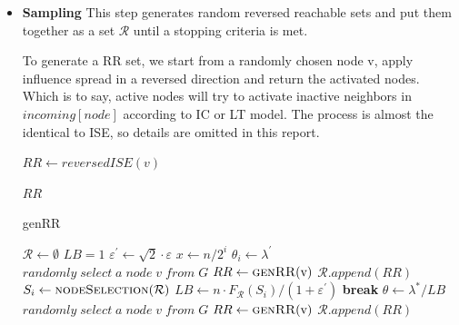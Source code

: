 \documentclass[conference]{IEEEtran}
\begin{document}
    \begin{itemize}
        \item \textbf{Sampling}
        This step generates random reversed reachable sets and put them together as a set $\mathcal{R}$ until a stopping criteria is met.

        
        
        To generate a RR set, we start from a randomly chosen node v, apply influence spread in a reversed direction and return the activated nodes. Which is to say, active nodes will try to activate inactive neighbors in $incoming[node]$ according to IC or LT model. The process is almost the identical to ISE, so details are omitted in this report.
        \begin{algorithm}[H]
            \begin{algorithmic}[1]
            \State $RR \gets reversedISE(v)$

            \Return $RR$
            \EndFunction
            \end{algorithmic}
            \caption{genRR}
        \end{algorithm}

        
        \begin{algorithm}[H]
            \begin{algorithmic}[1]
            \State $\mathcal{R} \gets \emptyset$
            \State $LB = 1$
            \State $\varepsilon^{\prime} \gets \sqrt{2} \cdot \varepsilon$
                \State $x \gets n/2^i$
                \State $\theta_{i} \gets \lambda^{\prime}$
                \State $ randomly\;select\;a\;node\;v\;from\;G$
                \State $RR \gets \Call{genRR}{$v$}$
                \State $\mathcal{R}.append(RR)$
                \EndWhile
                \State $S_i \gets \Call{nodeSelection}{\mathcal{R}}$
                    \State $LB \gets n\cdot F_{\mathcal{R}}(S_i)/(1+\varepsilon^{\prime})$
                    \State \textbf{break}
                \EndIf
            \EndFor
            \State $\theta \gets \lambda^{*}/LB$
            \State $ randomly\;select\;a\;node\;v\;from\;G$
            \State $RR \gets \Call{genRR}{$v$}$
            \State $\mathcal{R}.append(RR)$
            \EndWhile 



\end{algorithmic}
\end{algorithm}
\end{itemize}
\end{document}
